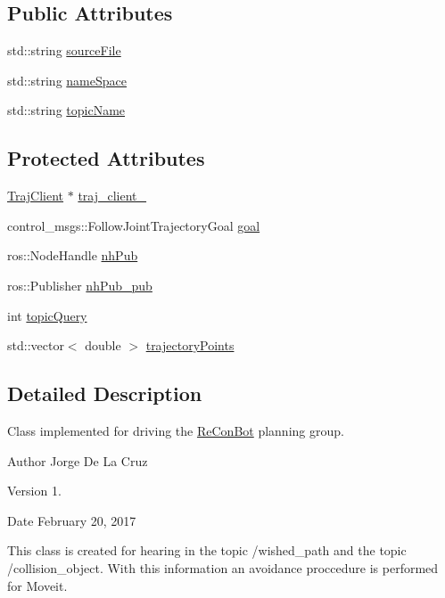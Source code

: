 \subsection*{Public Attributes}
\begin{DoxyCompactItemize}
\item 
std\+::string \hyperlink{class_re_con_bot_a65cf4bed9bbabd92e1265d05507e0945}{source\+File}
\item 
std\+::string \hyperlink{class_re_con_bot_a40ca07cd606988b78664c4a52fd8dc59}{name\+Space}
\item 
std\+::string \hyperlink{class_re_con_bot_a1d91d2ea8c0f16340440357906fb9ebf}{topic\+Name}
\end{DoxyCompactItemize}
\subsection*{Protected Attributes}
\begin{DoxyCompactItemize}
\item 
\hyperlink{basic__arm_8cpp_a6fb8875093261cdc69e54d3ac7d5c301}{Traj\+Client} $\ast$ \hyperlink{class_re_con_bot_a14a35ad6ca284af7db7228d7872720d1}{traj\+\_\+client\+\_\+}
\item 
control\+\_\+msgs\+::\+Follow\+Joint\+Trajectory\+Goal \hyperlink{class_re_con_bot_a9bd1c7ddf2376e2e68ea5d8bd8c3f505}{goal}
\item 
ros\+::\+Node\+Handle \hyperlink{class_re_con_bot_a37edfe9c2dbbf37894c9bf850806fdd3}{nh\+Pub}
\item 
ros\+::\+Publisher \hyperlink{class_re_con_bot_a549b7542d286b690f38b7ece8b83850b}{nh\+Pub\+\_\+pub}
\item 
int \hyperlink{class_re_con_bot_aba20d307ac1b2e6b22f96da83a0d937d}{topic\+Query}
\item 
std\+::vector$<$ double $>$ \hyperlink{class_re_con_bot_a7c59e136741800bf0734f659119aa5ee}{trajectory\+Points}
\end{DoxyCompactItemize}


\subsection{Detailed Description}
Class implemented for driving the \hyperlink{class_re_con_bot}{Re\+Con\+Bot} planning group. 

\begin{DoxyAuthor}{Author}
Jorge De La Cruz 
\end{DoxyAuthor}
\begin{DoxyVersion}{Version}
1. 
\end{DoxyVersion}
\begin{DoxyDate}{Date}
February 20, 2017
\end{DoxyDate}
This class is created for hearing in the topic /wished\+\_\+path and the topic /collision\+\_\+object. With this information an avoidance proccedure is performed for Moveit. 


